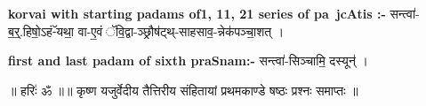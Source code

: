 \documentclass[17pt]{extarticle}
\begin{document}
\textbf{korvai with starting padams of1, 11, 21 series of pa~jcAtis :-} \newline
सन्त्वा॑-ब॒र्॒.हिषो॒ऽहं-ॅयथा॒ वा-ए॒वं ॅवि॒द्वा-ञ्छ्रौष॑ट्थ्-साहसाव॒-न्नेक॑पञ्चा॒शत् । \newline

\textbf{first and last padam of sixth praSnam:-} \newline
सन्त्वा॑-सिञ्चामि॒ दस्यून्॑ । \newline 


॥ हरिः॑ ॐ ॥॥ कृष्ण यजुर्वेदीय तैत्तिरीय संहितायां 
प्रथमकाण्डे षष्ठः प्रश्नः समाप्तः ॥ \newline
\pagebreak
\pagebreak
        
\end{document}
